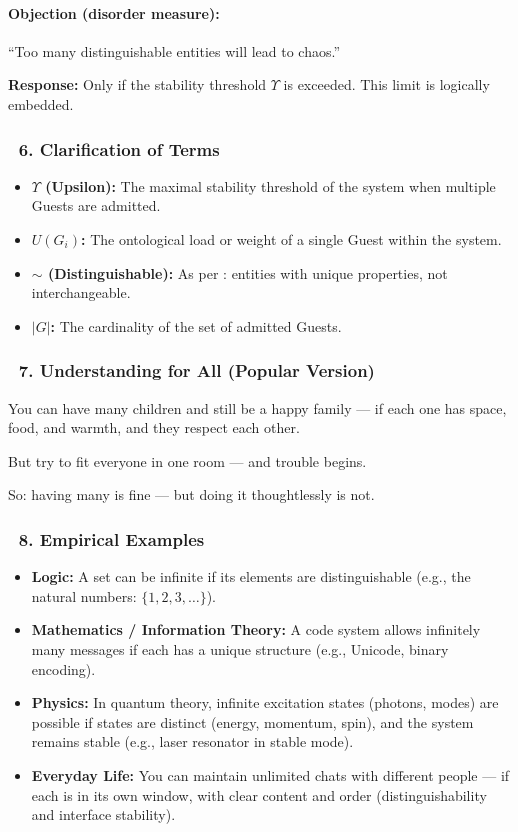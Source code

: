 \documentclass[12pt]{article}
\begin{document}
\bigskip

\paragraph{Objection (disorder measure):}
``Too many distinguishable entities will lead to chaos.''

\textbf{Response:} Only if the stability threshold $\Upsilon$ is exceeded. This limit is logically embedded.

\subsubsection*{🔹 6. Clarification of Terms}

\begin{itemize}
\item \textbf{$\Upsilon$ (Upsilon):} The maximal stability threshold of the system when multiple Guests are admitted.
\item \textbf{$U(G_i)$:} The ontological load or weight of a single Guest within the system.
\item \textbf{$\sim$ (Distinguishable):} As per \text{[5]}: entities with unique properties, not interchangeable.
\item \textbf{$|G|$:} The cardinality of the set of admitted Guests.
\end{itemize}

\subsubsection*{🔹 7. Understanding for All (Popular Version)}

You can have many children and still be a happy family — if each one has space, food, and warmth, and they respect each other.

But try to fit everyone in one room — and trouble begins.

So: having many is fine — but doing it thoughtlessly is not.

\subsubsection*{🔹 8. Empirical Examples}

\begin{itemize}
\item \textbf{Logic:} A set can be infinite if its elements are distinguishable (e.g., the natural numbers: $\{1, 2, 3, \dots\}$).
\item \textbf{Mathematics / Information Theory:} A code system allows infinitely many messages if each has a unique structure (e.g., Unicode, binary encoding).
\item \textbf{Physics:} In quantum theory, infinite excitation states (photons, modes) are possible if states are distinct (energy, momentum, spin), and the system remains stable (e.g., laser resonator in stable mode).
\item \textbf{Everyday Life:} You can maintain unlimited chats with different people — if each is in its own window, with clear content and order (distinguishability and interface stability).
\end{itemize}
\end{document}
